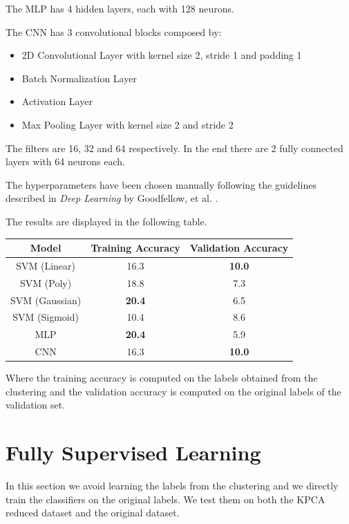The MLP has 4 hidden layers, each with 128 neurons.

The CNN has 3 convolutional blocks composed by:
\begin{itemize}
    \item 2D Convolutional Layer with kernel size 2, stride 1 and padding 1
    \item Batch Normalization Layer
    \item Activation Layer
    \item Max Pooling Layer with kernel size 2 and stride 2
\end{itemize}
The filters are 16, 32 and 64 respectively. In the end there are 2 fully
connected layers with 64 neurons each.

The hyperparameters have been chosen manually following the guidelines
described in \textit{Deep Learning} by Goodfellow, et al. \cite{goodfellow2016deep}.



The results are displayed in the following table.
\begin{table}[H]
    \centering
    \begin{tabular}{|c|c|c|}
        \hline
        Model          & Training Accuracy & Validation Accuracy \\
        \hline
        SVM (Linear)   & 16.3 & \textbf{10.0} \\
        SVM (Poly)     & 18.8 & 7.3 \\
        SVM (Gaussian) & \textbf{20.4} & 6.5 \\
        SVM (Sigmoid)  & 10.4 & 8.6 \\
        MLP            & \textbf{20.4} & 5.9 \\
        CNN            & 16.3 & \textbf{10.0} \\
        \hline
    \end{tabular}
\end{table}
Where the training accuracy is computed on the labels obtained from the
clustering and the validation accuracy is computed on the original labels of 
the validation set.


\section{Fully Supervised Learning}

In this section we avoid learning the labels from the clustering and we
directly train the classifiers on the original labels. We test them on
both the KPCA reduced dataset and the original dataset.

